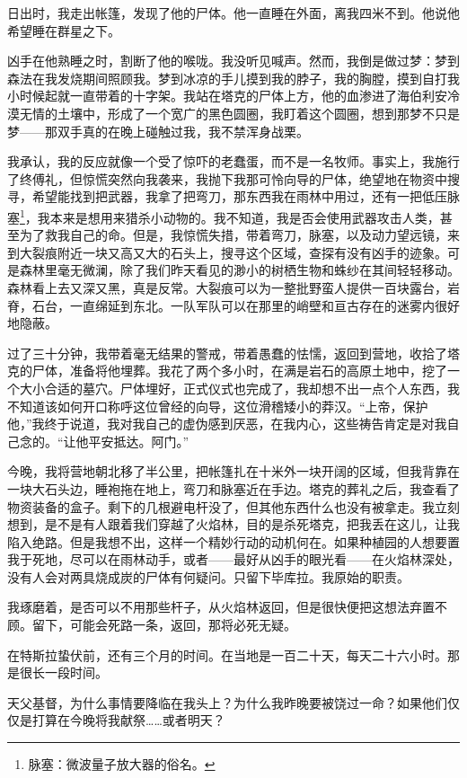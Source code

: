 \documentclass[AutoFakeBold=true]{book}
\begin{document}
日出时，我走出帐篷，发现了他的尸体。他一直睡在外面，离我四米不到。他说他希望睡在群星之下。

凶手在他熟睡之时，割断了他的喉咙。我没听见喊声。然而，我倒是做过梦：梦到森法在我发烧期间照顾我。梦到冰凉的手儿摸到我的脖子，我的胸膛，摸到自打我小时候起就一直带着的十字架。我站在塔克的尸体上方，他的血渗进了海伯利安冷漠无情的土壤中，形成了一个宽广的黑色圆圈，我盯着这个圆圈，想到那梦不只是梦——那双手真的在晚上碰触过我，我不禁浑身战栗。

我承认，我的反应就像一个受了惊吓的老蠢蛋，而不是一名牧师。事实上，我施行了终傅礼，但惊慌突然向我袭来，我抛下我那可怜向导的尸体，绝望地在物资中搜寻，希望能找到把武器，我拿了把弯刀，那东西我在雨林中用过，还有一把低压脉塞\footnote{脉塞：微波量子放大器的俗名。}，我本来是想用来猎杀小动物的。我不知道，我是否会使用武器攻击人类，甚至为了救我自己的命。但是，我惊慌失措，带着弯刀，脉塞，以及动力望远镜，来到大裂痕附近一块又高又大的石头上，搜寻这个区域，查探有没有凶手的迹象。可是森林里毫无微澜，除了我们昨天看见的渺小的树栖生物和蛛纱在其间轻轻移动。森林看上去又深又黑，真是反常。大裂痕可以为一整批野蛮人提供一百块露台，岩脊，石台，一直绵延到东北。一队军队可以在那里的峭壁和亘古存在的迷雾内很好地隐蔽。

过了三十分钟，我带着毫无结果的警戒，带着愚蠢的怯懦，返回到营地，收拾了塔克的尸体，准备将他埋葬。我花了两个多小时，在满是岩石的高原土地中，挖了一个大小合适的墓穴。尸体埋好，正式仪式也完成了，我却想不出一点个人东西，我不知道该如何开口称呼这位曾经的向导，这位滑稽矮小的莽汉。``上帝，保护他，''我终于说道，我对我自己的虚伪感到厌恶，在我内心，这些祷告肯定是对我自己念的。``让他平安抵达。阿门。''

今晚，我将营地朝北移了半公里，把帐篷扎在十米外一块开阔的区域，但我背靠在一块大石头边，睡袍拖在地上，弯刀和脉塞近在手边。塔克的葬礼之后，我查看了物资装备的盒子。剩下的几根避电杆没了，但其他东西什么也没有被拿走。我立刻想到，是不是有人跟着我们穿越了火焰林，目的是杀死塔克，把我丢在这儿，让我陷入绝路。但是我想不出，这样一个精妙行动的动机何在。如果种植园的人想要置我于死地，尽可以在雨林动手，或者——最好从凶手的眼光看——在火焰林深处，没有人会对两具烧成炭的尸体有何疑问。只留下毕库拉。我原始的职责。

我琢磨着，是否可以不用那些杆子，从火焰林返回，但是很快便把这想法弃置不顾。留下，可能会死路一条，返回，那将必死无疑。

在特斯拉蛰伏前，还有三个月的时间。在当地是一百二十天，每天二十六小时。那是很长一段时间。

天父基督，为什么事情要降临在我头上？为什么我昨晚要被饶过一命？如果他们仅仅是打算在今晚将我献祭……或者明天？
\end{document}
